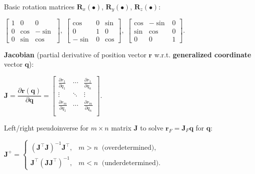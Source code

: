 \documentclass[landscape]{article}
\newcommand{\vmspace}{\vspace{-7pt}}
\newcommand{\vpspace}{\vspace{5pt}}
\begin{document}
\begin{multicols}{3}
\begin{minipage}{\columnwidth}
  Basic rotation matrices $\mathbf R_x(\bullet)$, $\mathbf R_y(\bullet)$, $\mathbf
  R_z(\bullet)$:
  \vmspace
  \begin{center}
    $\left[\begin{matrix}
      1 & 0 & 0 \\
      0 & \cos & -\sin \\
      0 & \sin & \cos
    \end{matrix}\right],\;
    \left[\begin{matrix}
      \cos & 0 & \sin \\
      0 & 1 & 0 \\
      -\sin & 0 & \cos
    \end{matrix}\right],\;
    \left[\begin{matrix}
      \cos & -\sin & 0 \\
      \sin & \cos & 0 \\
      0 & 0 & 1
    \end{matrix}\right].$
  \end{center}
\end{minipage}

\vpspace

\begin{minipage}{\columnwidth}
  \textbf{Jacobian} (partial derivative of position vector $\mathbf{r}$
  w.r.t. \textbf{generalized coordinate} vector $\mathbf{q}$):
  \vmspace
  \begin{center}
    $
    \mathbf J
    =
    \dfrac{\partial \mathbf{r}(\mathbf q)}{\partial \mathbf q}
    =
    \left[
    \begin{matrix}
      \frac{\partial r_1}{\partial q_1} & \cdots & \frac{\partial r_1}{\partial
      q_n} \\
      \vdots & \ddots & \vdots \\
      \frac{\partial r_m}{\partial q_1} & \cdots & \frac{\partial r_m}{\partial
      q_n} \\
    \end{matrix}
    \right]
    $.
  \end{center}
\end{minipage}

\vpspace

\begin{minipage}{\columnwidth}
  Left/right pseudoinverse for $m \times n$ matrix $\mathbf{J}$ to solve
  $\mathbf r_F = \mathbf J_F \mathbf q$ for $\mathbf q$:
  \vmspace
  \begin{center}
    $\mathbf{J}^+=
    \begin{cases}
      (\mathbf{J}^\intercal \mathbf J)^{-1} \mathbf J^\intercal, & m>n\;\;
      \text{(overdetermined)},\\
      \mathbf J^\intercal (\mathbf{J} \mathbf J^\intercal)^{-1}, & m<n\;\;
      \text{(underdetermined).}
    \end{cases}$
  \end{center}
\end{minipage}


\end{multicols}
\end{document}
